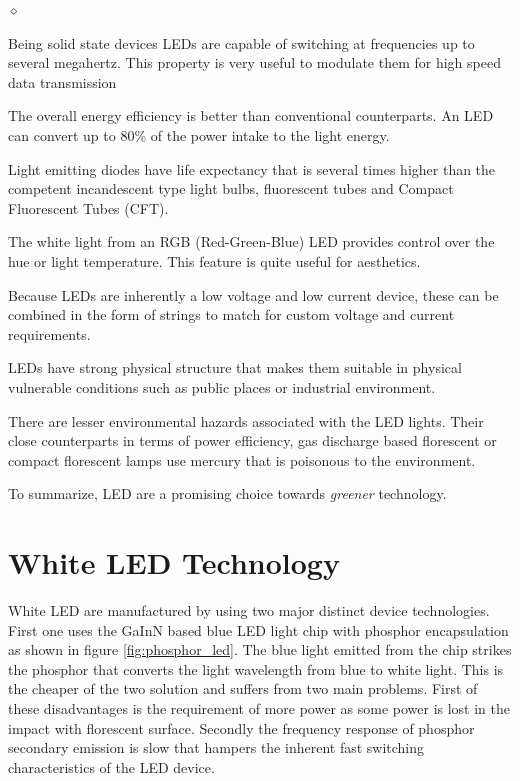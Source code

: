 \begin{list}{$\diamond$}{\setlength{\leftmargin}{.5in}%
\setlength{\rightmargin}{.5in}}

\item Being solid state devices LEDs are capable of switching at frequencies up to several megahertz. This property is very useful to modulate them for high speed data transmission

\item The overall energy efficiency is better than conventional counterparts. An LED can convert up to 80\% of the power intake to the light energy.

\item Light emitting diodes have life expectancy that is several times higher than the competent incandescent type light bulbs, fluorescent tubes and Compact Fluorescent Tubes (CFT).

\item The white light from an RGB (Red-Green-Blue) LED provides control over the hue or light temperature. This feature is quite useful for aesthetics. 

\item Because LEDs are inherently a low voltage and low current device, these can be combined in the form of strings to match for custom voltage and current requirements.

\item LEDs have strong physical structure that makes them suitable in physical vulnerable conditions such as public places or industrial environment.

\item There are lesser environmental hazards associated with the LED lights. Their close counterparts in terms of power efficiency, gas discharge based florescent or compact florescent lamps use mercury that is poisonous to the environment. 

\end{list}

To summarize, LED are a promising choice towards \emph{greener} technology. 

\section{White LED Technology}

White LED are manufactured by using two major distinct device technologies. First one uses the GaInN based blue LED light chip with phosphor encapsulation as shown in figure \ref{fig:phosphor_led}. The blue light emitted from the chip strikes the phosphor that converts the light wavelength from blue to white light. This is the cheaper of the two solution and suffers from two main problems. First of these disadvantages is the requirement of more power as some power is lost in the impact with florescent surface. Secondly the frequency response of phosphor secondary emission is slow that hampers the inherent fast switching characteristics of the LED device.


